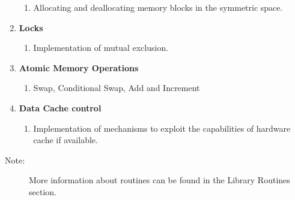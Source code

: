 \begin{enumerate}
\begin{enumerate}
\item Allocating and deallocating memory blocks in the symmetric space.
\end{enumerate}
\item \textbf{Locks}

\begin{enumerate}
\item Implementation of mutual exclusion.
\end{enumerate}
\item \textbf{Atomic Memory Operations}

\begin{enumerate}
\item Swap, Conditional Swap, Add and Increment 
\end{enumerate}
\item \textbf{Data Cache control}

\begin{enumerate}
\item Implementation of mechanisms to exploit the capabilities of hardware
cache if available.
\end{enumerate}
\end{enumerate}
\begin{description}
\item [{{Note:}}] More information about \openshmem routines can be found
in the Library Routines section.
\end{description}
